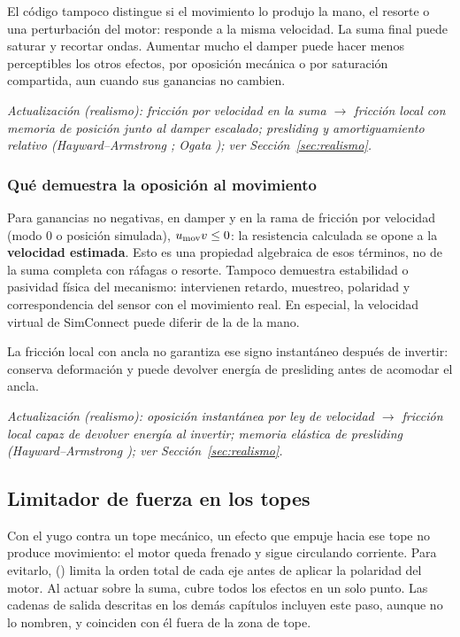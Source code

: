 El código tampoco distingue si el movimiento lo produjo la mano, el resorte o una perturbación del motor: responde a la misma velocidad. La suma final puede saturar y recortar ondas. Aumentar mucho el damper puede hacer menos perceptibles los otros efectos, por oposición mecánica o por saturación compartida, aun cuando sus ganancias no cambien.


\textit{Actualización (realismo): fricción por velocidad en la suma $\rightarrow$ fricción local con memoria de posición junto al damper escalado; presliding y amortiguamiento relativo (Hayward--Armstrong \cite{hayward2000}; Ogata \cite{ogata}); ver Sección~\ref{sec:realismo}.}

\subsubsection{Qué demuestra la oposición al movimiento}
Para ganancias no negativas, en damper y en la rama de fricción por velocidad (modo 0 o posición simulada), $u_{\rm mov}v\le0$: la resistencia calculada se opone a la \textbf{velocidad estimada}. Esto es una propiedad algebraica de esos términos, no de la suma completa con ráfagas o resorte. Tampoco demuestra estabilidad o pasividad física del mecanismo: intervienen retardo, muestreo, polaridad y correspondencia del sensor con el movimiento real. En especial, la velocidad virtual de SimConnect puede diferir de la de la mano.

La fricción local con ancla no garantiza ese signo instantáneo después de invertir: conserva deformación y puede devolver energía de presliding antes de acomodar el ancla.

\textit{Actualización (realismo): oposición instantánea por ley de velocidad $\rightarrow$ fricción local capaz de devolver energía al invertir; memoria elástica de presliding (Hayward--Armstrong \cite{hayward2000}); ver Sección~\ref{sec:realismo}.}

\subsection{Limitador de fuerza en los topes}
\label{sec:limite_topes}
Con el yugo contra un tope mecánico, un efecto que empuje hacia ese tope no produce movimiento: el motor queda frenado y sigue circulando corriente. Para evitarlo,  () limita la orden total de cada eje antes de aplicar la polaridad del motor. Al actuar sobre la suma, cubre todos los efectos en un solo punto. Las cadenas de salida descritas en los demás capítulos incluyen este paso, aunque no lo nombren, y coinciden con él fuera de la zona de tope.


